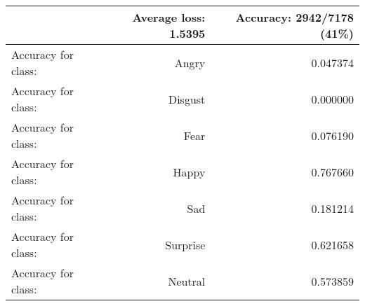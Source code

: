 \begin{tabular}{lrr}
\toprule
{} & Average loss: 1.5395 &  Accuracy: 2942/7178 (41\%) \\
\midrule
Accuracy for class: &                Angry &                   0.047374 \\
Accuracy for class: &              Disgust &                   0.000000 \\
Accuracy for class: &                 Fear &                   0.076190 \\
Accuracy for class: &                Happy &                   0.767660 \\
Accuracy for class: &                  Sad &                   0.181214 \\
Accuracy for class: &             Surprise &                   0.621658 \\
Accuracy for class: &              Neutral &                   0.573859 \\
\bottomrule
\end{tabular}
